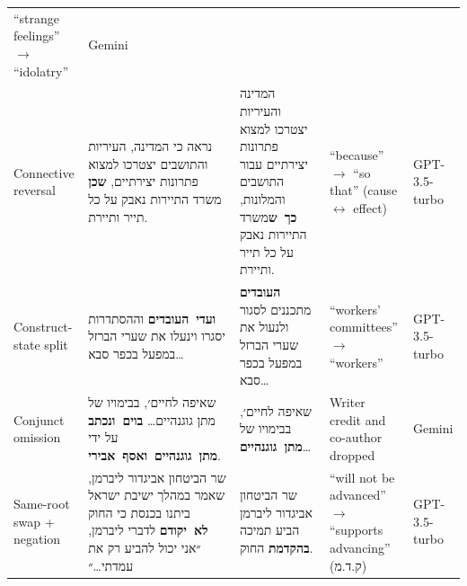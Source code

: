 \documentclass[10pt,border=1pt]{standalone}
\newcommand{\s}[1]{\textbf{\textcolor{srcc}{#1}}}
\newcommand{\e}[1]{\textbf{\textcolor{errc}{#1}}}
\begin{document}
\begin{minipage}{16cm}
\begin{tabularx}{16cm}{@{}E{3.0cm}HHE{3.4cm}E{1.55cm}@{}}
``strange feelings'' $\rightarrow$ ``idolatry'' & Gemini\\
\addlinespace
Connective reversal &
נראה כי המדינה, העיריות והתושבים יצטרכו למצוא פתרונות יצירתיים, \s{שכן} משרד התיירות נאבק על כל תייר ותיירת. &
המדינה והעיריות יצטרכו למצוא פתרונות יצירתיים עבור התושבים והמלונות, \e{כך~ש}משרד התיירות נאבק על כל תייר ותיירת. &
``because'' $\rightarrow$ ``so that'' (cause $\leftrightarrow$ effect) & GPT-3.5-turbo\\
\addlinespace
Construct-state split &
\s{ועדי~העובדים} וההסתדרות יסגרו וינעלו את שערי הברזל במפעל בכפר סבא… &
\e{העובדים} מתכננים לסגור ולנעול את שערי הברזל במפעל בכפר סבא… &
``workers' committees'' $\rightarrow$ ``workers'' & GPT-3.5-turbo\\
\addlinespace
Conjunct omission &
שאיפה לחיים׳, בבימויו של מתן גוגנהיים… \s{בוים~ונכתב} על ידי \s{מתן~גוגנהיים~ואסף~אבירי}. &
שאיפה לחיים׳, בבימויו של \e{מתן~גוגנהיים}… &
Writer credit and co-author dropped & Gemini\\
\addlinespace
Same-root swap + negation &
שר הביטחון אביגדור ליברמן, שאמר במהלך ישיבת ישראל ביתנו בכנסת כי החוק \s{לא~יקודם} לדברי ליברמן, ״אני יכול להביע רק את עמדתי…״ &
שר הביטחון אביגדור ליברמן הביע תמיכה \e{בהקדמת} החוק. &
``will not be advanced'' $\rightarrow$ ``supports advancing'' (\texthebrew{ק.ד.מ}) & GPT-3.5-turbo\\
\bottomrule
\end{tabularx}
\end{minipage}
\end{document}

